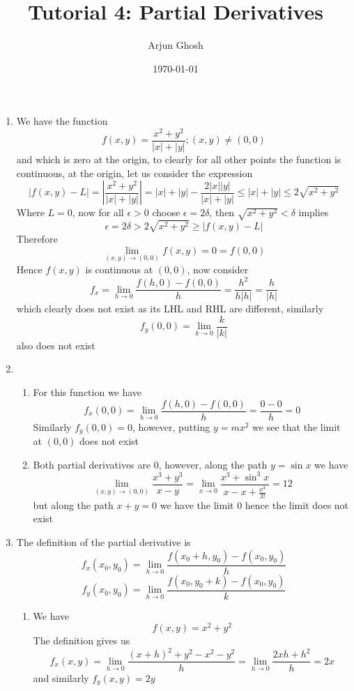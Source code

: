 \documentclass[12pt]{article}
\title{Tutorial 4: Partial Derivatives}
\author{Arjun Ghosh}
\date{\today}
\begin{document}
\maketitle
\begin{enumerate}
\item 
We have the function 
$$
f(x,y) = \frac{x^{2} + y^{2}}{|x| + | y|}; (x,y) \neq (0,0)
$$
and which is zero at the origin, to clearly for all other points the function is continuous, at the origin, let us consider the expression
$$
|f(x,y)-L| = |\frac{x^{2} + y^{2}}{|x| + | y|}| = |x| + | y | -\frac{2|x||y|}{|x| + | y|} \leq | x| + | y| \leq 2\sqrt{ x^{2} + y^{2} }
$$
Where $L = 0$, now for all $\epsilon > 0$ choose $\epsilon = 2\delta$, then $\sqrt{ x^{2} + y^{2} } < \delta$ implies
$$
\epsilon = 2 \delta > 2\sqrt{ x^{2} + y^{2} } \geq |f(x,y)-L|
$$
Therefore
$$
\lim_{ (x,y) \to (0,0) } f(x,y) = 0 = f(0,0)
$$
Hence $f(x,y)$ is continuous at $(0,0)$, now consider
$$
f_{x} = \lim_{ h \to 0 } \frac{f(h,0)-f(0,0)}{h} = \frac{h^{2}}{h|h|} = \frac{h}{|h|}
$$
which clearly does not exist as its LHL and RHL are different, similarly
$$
f_{y}(0,0) = \lim_{ k \to 0 } \frac{k}{|k|}
$$
also does not exist
\item
\begin{enumerate}
\item
For this function we have 
$$
f_{x}(0,0) = \lim_{ h \to 0 } \frac{f(h,0)-f(0,0)}{h} = \frac{0-0}{h} = 0
$$
Similarly $f_y (0,0)= 0$, however, putting $y = mx^{2}$ we see that the limit at $(0,0)$ does not exist
\item
Both partial derivatives are $0$, however, along the path $y = \sin x$ we have
$$
\lim_{ (x,y) \to (0,0) } \frac{x^{3} + y^{3}}{x-y} = \lim_{ x \to 0 } \frac{x^{3} + \sin ^{3}x}{x - x + \frac{x^{3}}{3!}} = 12
$$
but along the path $x+y=0$ we have the limit $0$ hence the limit does not exist
\end{enumerate}
\item
The definition of the partial derivative is
$$
f_{x}(x_{0},y_{0}) = \lim_{ h \to 0 } \frac{f(x_{0} + h, y_{0})-f(x_{0}, y_{0})}{h}
$$
$$
f_{y}(x_{0},y_{0}) = \lim_{ h \to 0 } \frac{f(x_{0} , y_{0}+k)-f(x_{0}, y_{0})}{k}
$$

\begin{enumerate}
\item
We have
$$
f(x,y) = x^{2} + y^{2}
$$
The definition gives us
$$
f_{x}(x,y) = \lim_{ h \to 0 } \frac{(x + h)^{2} + y^{2} -x^{2} -y^{2}}{h} = \lim_{ h \to 0 } \frac{2xh + h^{2}}{h} = 2x
$$
and similarly $f_{y}(x,y)=2y$


\end{enumerate}
\end{enumerate}
\end{document}
